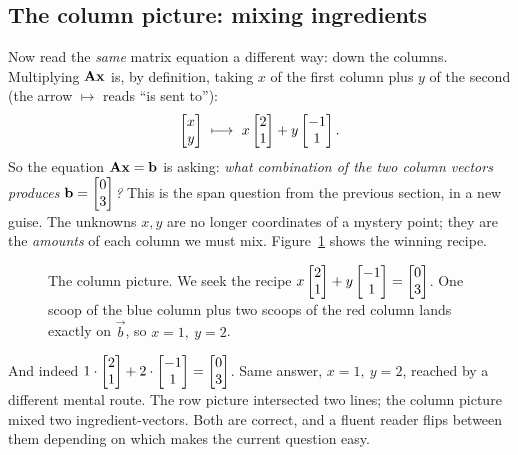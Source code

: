 \subsection{The column picture: mixing ingredients}

Now read the \emph{same} matrix equation a different way: down the columns. Multiplying
$\mathbf{A} \mathbf{x}$ is, by definition, taking $x$ of the first column plus $y$ of the second (the arrow
$\mapsto$ reads ``is sent to''):
\[
\colvec{x\\y}\ \longmapsto\
x\colvec{2\\1} + y\colvec{-1\\1}.
\]
So the equation $\mathbf{A}\mathbf{x} = \mathbf{b}$ is asking: \emph{what combination of the two column vectors
produces $\mathbf{b} = \begin{bmatrix}0\\3\end{bmatrix}$?} This is the span question from the previous section, in a new
guise. The unknowns $x,y$ are no longer coordinates of a mystery point; they are the \emph{amounts}
of each column we must mix. Figure~\ref{ch01:colpic} shows the winning recipe.

\begin{figure}[H]
\centering
{}
\caption{The column picture. We seek the recipe $x\begin{bmatrix}2\\1\end{bmatrix}+y\begin{bmatrix}-1\\1\end{bmatrix}=\begin{bmatrix}0\\3\end{bmatrix}$. One
scoop of the blue column plus two scoops of the red column lands exactly on $\vec b$, so $x=1,\ y=2$.}
\label{ch01:colpic}
\end{figure}

And indeed $1\cdot\begin{bmatrix}2\\1\end{bmatrix} + 2\cdot\begin{bmatrix}-1\\1\end{bmatrix} = \begin{bmatrix}0\\3\end{bmatrix}$. Same answer, $x=1,\ y=2$,
reached by a different mental route. The row picture intersected two lines; the column
picture mixed two ingredient-vectors. Both are correct, and a fluent reader flips between them
depending on which makes the current question easy.

